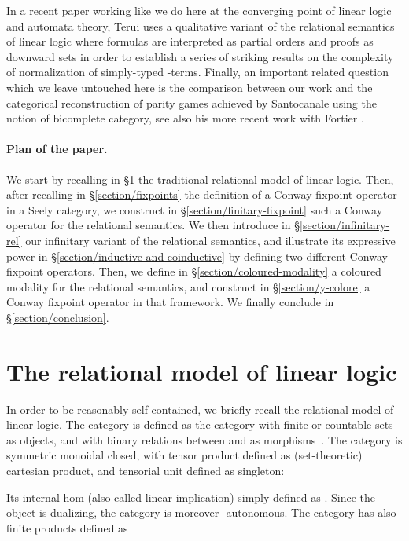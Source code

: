 \documentclass[runningheads,a4paper]{llncs}
\begin{document}
In a recent paper working like we do here at the converging point of linear logic and automata theory, 
Terui \cite{terui} uses a qualitative variant of the relational semantics of linear logic
where formulas are interpreted as partial orders and proofs as downward sets in order to
establish a series of striking results on the complexity of normalization of simply-typed -terms.
Finally, an important related question which we leave untouched here is the comparison
between our work
and the categorical reconstruction of parity games achieved by Santocanale
\cite{santocanale2,santocanale} using the notion of bicomplete category,
see also his more recent work with Fortier \cite{santocanale3}.






\paragraph*{Plan of the paper.}
We start by recalling in \S\ref{section/rel} the traditional relational model of linear logic.
Then, after recalling in \S\ref{section/fixpoints} the definition of a Conway fixpoint operator in a Seely category,
we construct in \S\ref{section/finitary-fixpoint} such a Conway operator for the relational semantics.
We then introduce in \S\ref{section/infinitary-rel} our infinitary variant of the relational semantics,
and illustrate its expressive power in \S\ref{section/inductive-and-coinductive} by defining two
different Conway fixpoint operators.
Then, we define in \S\ref{section/coloured-modality} a coloured modality for the relational semantics,
and construct in \S\ref{section/y-colore} a Conway fixpoint operator in that framework.
We finally conclude in \S\ref{section/conclusion}.

\section{The relational model of linear logic}
\label{section/rel}
In order to be reasonably self-contained, we briefly recall the relational model of linear logic.
The category  is defined as the category with finite or countable sets as objects, and with binary relations between  and 
as morphisms~.
The category  is symmetric monoidal closed, with tensor product defined as (set-theoretic) cartesian product,
and tensorial unit defined as singleton:

Its internal hom (also called linear implication)  simply defined as .
Since the object  is dualizing,
the category  is moreover -autonomous.
The category  has also finite products defined as
\end{document}

